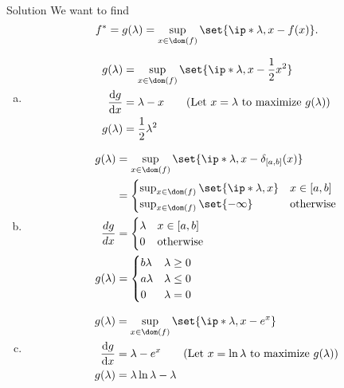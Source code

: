 \documentclass{article}
\begin{document}
\begin{solution}
    {Solution}
    We want to find \[f^* = g(\lambda) = \sup_{x\in\dom(f)}\set{\ip*{\lambda, x}-f(x)}.\]
    \begin{enumerate}[(a)]
        \item {
            \begin{align*}
                g(\lambda) 
                &= \sup_{x\in\dom(f)}\set{\ip*{\lambda, x}-\frac{1}{2}x^2} \\
                \frac{\diff g}{\diff x} &= \lambda - x \tag{\text{Let $x=\lambda$ to maximize $g(\lambda)$}}\\
                g(\lambda) &= \frac{1}{2}\lambda^2
            \end{align*}
        }
        \item {
            \begin{align*}
                g(\lambda) 
                &= \sup_{x\in\dom(f)}\set{\ip*{\lambda, x}-\delta_{[a, b]}(x)} \\
                &= \begin{cases}
                    \sup_{x\in\dom(f)}\set{\ip*{\lambda, x}} & x\in[a, b] \\
                    \sup_{x\in\dom(f)} \set{-\infty} & \text{otherwise}
                \end{cases} \\
                \frac{dg}{dx} &= \begin{cases}
                    \lambda & x\in[a, b] \\
                    0 & \text{otherwise}
                \end{cases} \\
                g(\lambda) &= \begin{cases}
                    b\lambda & \lambda\geq 0 \\
                    a\lambda & \lambda\leq 0 \\
                    0 & \lambda=0
                \end{cases}
            \end{align*}
        }
        \item {
            \begin{align*}
                g(\lambda)
                &= \sup_{x\in\dom(f)}\set{\ip*{\lambda, x}-e^x} \\
                \frac{\diff g}{\diff x} &= \lambda - e^x \tag{\text{Let $x=\ln\lambda$ to maximize $g(\lambda)$}}\\
                g(\lambda) &= \lambda\ln\lambda - \lambda
            \end{align*}
        }
    \end{enumerate}
\end{solution}
\end{document}
